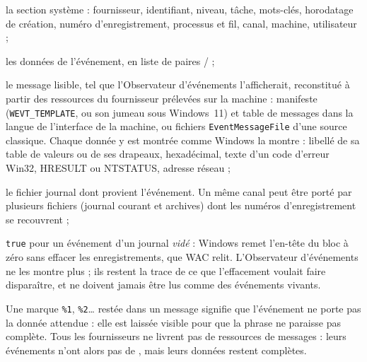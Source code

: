 \documentclass[11pt,a4paper,oneside]{report}
\begin{document}
\begin{description}[style=nextline,leftmargin=1.2em]
  \item[\champ{EvtSystem*}] la section système : fournisseur, identifiant,
        niveau, tâche, mots-clés, horodatage de création, numéro d'enregistrement,
        processus et fil, canal, machine, utilisateur ;
  \item[\champ{EvtEventData}] les données de l'événement, en liste de paires
         /  ;
  \item[\champ{EvtEventMessage}] le message lisible, tel que l'Observateur
        d'événements l'afficherait, reconstitué à partir des ressources du
        fournisseur prélevées sur la machine : manifeste (\texttt{WEVT\_TEMPLATE},
        ou son jumeau  sous
        Windows~11) et table de messages dans la langue de l'interface de la
        machine, ou fichiers \texttt{EventMessageFile} d'une source classique.
        Chaque donnée y est montrée comme Windows la montre : libellé de sa
        table de valeurs ou de ses drapeaux, hexadécimal, texte d'un code
        d'erreur Win32, HRESULT ou NTSTATUS, adresse réseau ;
  \item[\champ{EvtSourceLog}] le fichier journal dont provient l'événement. Un
        même canal peut être porté par plusieurs fichiers (journal courant et
        archives) dont les numéros d'enregistrement se recouvrent ;
  \item[\champ{EvtRecovered}] \texttt{true} pour un événement d'un journal
        \emph{vidé} : Windows remet l'en-tête du bloc à zéro sans effacer les
        enregistrements, que WAC relit. L'Observateur d'événements ne les montre
        plus ; ils restent la trace de ce que l'effacement voulait faire
        disparaître, et ne doivent jamais être lus comme des événements vivants.
\end{description}

\begin{note}
Une marque \texttt{\%1}, \texttt{\%2}\ldots{} restée dans un message signifie que
l'événement ne porte pas la donnée attendue : elle est laissée visible pour que la
phrase ne paraisse pas complète. Tous les fournisseurs ne livrent pas de
ressources de messages : leurs événements n'ont alors pas de
, mais leurs données restent complètes.
\end{note}

\end{document}
